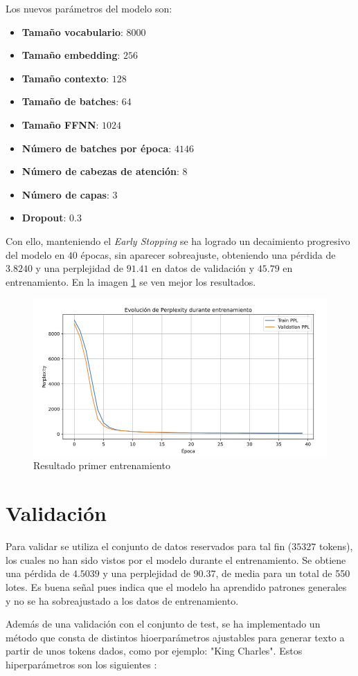 \documentclass[11pt]{book}
\begin{document}
Los nuevos parámetros del modelo son:
\begin{itemize}
    \item \textbf{Tamaño vocabulario}: $8000$
    \item \textbf{Tamaño embedding}: $256$
    \item \textbf{Tamaño contexto}: $128$
    \item \textbf{Tamaño de batches}: $64$
    \item \textbf{Tamaño FFNN}: $1024$
    \item \textbf{Número de batches por época}: $4146$
    \item \textbf{Número de cabezas de atención}: $8$
    \item \textbf{Número de capas}: $3$
    \item \textbf{Dropout}: $0.3$
\end{itemize}
Con ello, manteniendo el \textit{Early Stopping} se ha logrado un decaimiento progresivo del modelo en $40$ épocas, sin aparecer sobreajuste, obteniendo una pérdida de $3.8240$ y una perplejidad de $91.41$ en datos de validación y $45.79$ en entrenamiento. En la imagen \ref{fig:placeholder25} se ven mejor los resultados.


\begin{figure}[h]
    \centering
    \includegraphics[width=0.5\linewidth]{img/resultado_entrenamiento_v2.png}
    \caption{Resultado primer entrenamiento}
    \label{fig:placeholder25}
\end{figure}

\section{Validación}
Para validar se utiliza el conjunto de datos reservados para tal fin ($35327$ tokens), los cuales no han sido vistos por el modelo durante el entrenamiento. Se obtiene una pérdida de $4.5039$ y una perplejidad de $90.37$, de media para un total de 550 lotes. Es buena señal pues indica que el modelo ha aprendido patrones generales y no se ha sobreajustado a los datos de entrenamiento.

Además de una validación con el conjunto de test, se ha implementado un método que consta de distintos hioerparámetros ajustables para generar texto a partir de unos tokens dados, como por ejemplo: "King Charles". Estos hiperparámetros son los siguientes \parencite{vyas2025transformer_decoder_part3}: 
\end{document}
